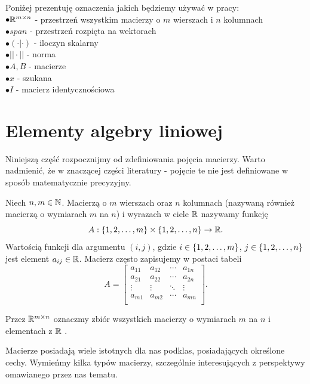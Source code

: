 \documentclass[12pt,a4paper]{report}
\newcommand{\mx}[1]{{#1}}
\begin{document}
Poniżej prezentuję oznaczenia jakich będziemy używać w pracy: \\
$\bullet\mathbb{R}^{m \times n}$ - przestrzeń wszystkim macierzy o $m$ wierszach i $n$ kolumnach \\
$\bullet span$ - przestrzeń rozpięta na wektorach \\ 
$\bullet(\cdot |\cdot )$ - iloczyn skalarny \\
$\bullet ||\cdot || $ - norma \\
$\bullet \mx{A}, \mx{B}$ - macierze \\
$\bullet x$ - szukana \\
$\bullet \mx{I}$ - macierz identycznościowa

\section{Elementy algebry liniowej} 

Niniejszą część rozpocznijmy od zdefiniowania pojęcia macierzy. Warto nadmienić, że w znaczącej części literatury - pojęcie te nie jest definiowane w sposób matematycznie precyzyjny.

\begin{definition}
Niech $n,m \in \mathbb{N}$. Macierzą o $m$ wierszach oraz $n$ kolumnach (nazywaną również macierzą o wymiarach $m$ na $n$) i wyrazach w ciele $\mathbb{R}$ nazywamy funkcję 
$$
\mx{A}: \set{1,2, \ldots ,m}\times \set{1,2, \ldots ,n} \to \setR.
$$
Wartością funkcji dla argumentu $(i,j)$, gdzie $i \in \left\lbrace {1,2, \ldots ,m} \right\rbrace$, $j \in \left\lbrace {1,2, \ldots ,n} \right\rbrace$ jest element $a_{ij} \in \mathbb{R}$. Macierz często zapisujemy w postaci tabeli
$$
\mx{A} = \begin{bmatrix}
 a_{11} & a_{12} & \cdots & a_{1n} \\
         a_{21} & a_{22} & \cdots & a_{2n} \\
         \vdots & \vdots & \ddots & \vdots \\
         a_{m1} & a_{m2} & \cdots & a_{mn} \\
\end{bmatrix}.
$$

Przez $\mathbb{R}^{m \times n}$ oznaczmy zbiór wszystkich macierzy o wymiarach $m$ na $n$ i elementach z $\mathbb{R}$ .
\end{definition}

Macierze posiadają wiele istotnych dla nas podklas, posiadających określone cechy. Wymieńmy kilka typów macierzy, szczególnie interesujących z perspektywy omawianego przez nas tematu.
\end{document}
